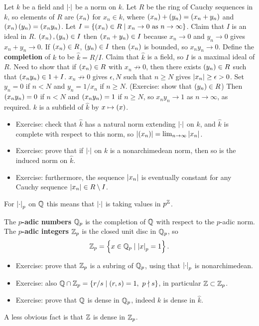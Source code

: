 Let $ k $ be a field and $ \left\lvert \cdot \right\rvert $ be a norm on $ k $. Let $ R $ be the ring of Cauchy sequences in $ k $, so elements of $ R $ are $ \left( x_n \right) $ for $ x_n \in k $, where $ \left( x_n \right) + \left( y_n \right) = \left( x_n + y_n \right) $ and $ \left( x_n \right)\left( y_n \right) = \left( x_ny_n \right) $. Let $ I = \left\{ \left( x_n \right) \in R \mid x_n \to 0 \text{ as } n \to \infty \right\} $. Claim that $ I $ is an ideal in $ R $. $ \left( x_n \right), \left( y_n \right) \in I $ then $ \left( x_n + y_n \right) \in I $ because $ x_n \to 0 $ and $ y_n \to 0 $ gives $ x_n + y_n \to 0 $. If $ \left( x_n \right) \in R $, $ \left( y_n \right) \in I $ then $ \left( x_n \right) $ is bounded, so $ x_ny_n \to 0 $. Define the \textbf{completion} of $ k $ to be $ \widehat{k} = R / I $. Claim that $ \widehat{k} $ is a field, so $ I $ is a maximal ideal of $ R $. Need to show that if $ \left( x_n \right) \in R $ with $ x_n \not\to 0 $, then there exists $ \left( y_n \right) \in R $ such that $ \left( x_ny_n \right) \in 1 + I $. $ x_n \not\to 0 $ gives $ \epsilon, N $ such that $ n \ge N $ gives $ \left\lvert x_n \right\rvert \ge \epsilon > 0 $. Set $ y_n = 0 $ if $ n < N $ and $ y_n = 1 / x_n $ if $ n \ge N $. (Exercise: show that $ \left( y_n \right) \in R $) Then $ \left( x_ny_n \right) = 0 $ if $ n < N $ and $ \left( x_ny_n \right) = 1 $ if $ n \ge N $, so $ x_ny_n \to 1 $ as $ n \to \infty $, as required. $ k $ is a subfield of $ \widehat{k} $ by $ x \mapsto \left( x \right) $.
\begin{itemize}
\item Exercise: check that $ \widehat{k} $ has a natural norm extending $ \left\lvert \cdot \right\rvert $ on $ k $, and $ \widehat{k} $ is complete with respect to this norm, so $ \left\lvert \left( x_n \right) \right\rvert = \lim_{n \to \infty} \left\lvert x_n \right\rvert $.
\item Exercise: prove that if $ \left\lvert \cdot \right\rvert $ on $ k $ is a nonarchimedean norm, then so is the induced norm on $ \widehat{k} $.
\item Exercise: furthermore, the sequence $ \left\lvert x_n \right\rvert $ is eventually constant for any Cauchy sequence $ \left\lvert x_n \right\rvert \in R \setminus I $.
\end{itemize}

\begin{note*}
For $ \left\lvert \cdot \right\rvert_p $ on $ \mathbb{Q} $ this means that $ \left\lvert \cdot \right\rvert $ is taking values in $ p^{\mathbb{Z}} $.
\end{note*}

\begin{definition}
The \textbf{$ p $-adic numbers} $ \mathbb{Q}_p $ is the completion of $ \mathbb{Q} $ with respect to the $ p $-adic norm. The \textbf{$ p $-adic integers} $ \mathbb{Z}_p $ is the closed unit disc in $ \mathbb{Q}_p $, so
$$ \mathbb{Z}_p = \left\{ x \in \mathbb{Q}_p \mid \left\lvert x \right\rvert_p = 1 \right\}. $$
\begin{itemize}
\item Exercise: prove that $ \mathbb{Z}_p $ is a subring of $ \mathbb{Q}_p $, using that $ \left\lvert \cdot \right\rvert_p $ is nonarchimedean.
\item Exercise: also $ \mathbb{Q} \cap \mathbb{Z}_p = \left\{ r / s \mid \left( r, s \right) = 1, \ p \nmid s \right\} $, in particular $ \mathbb{Z} \subset \mathbb{Z}_p $.
\item Exercise: prove that $ \mathbb{Q} $ is dense in $ \mathbb{Q}_p $, indeed $ k $ is dense in $ \widehat{k} $.
\end{itemize}
A less obvious fact is that $ \mathbb{Z} $ is dense in $ \mathbb{Z}_p $.
\end{definition}

